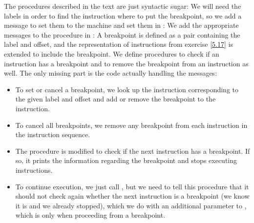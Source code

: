 \begin{exe}[5.19]
    The procedures described in the text are just syntactic sugar:
    We will need the labels in order to find the instruction where to put the 
    breakpoint, so we add a message to set them to the machine and set them in 
    :
    We add the appropriate messages to the  procedure in 
    :
    A breakpoint is defined as a pair containing the label and offset, and the 
    representation of instructions from exercise \ref{5.17} is extended to 
    include the breakpoint. We define procedures to check if an instruction has 
    a breakpoint and to remove the breakpoint from an instruction as well.
    The only missing part is the code actually handling the messages:
    \begin{itemize}
	\item To set or cancel a breakpoint, we look up the instruction 
	    corresponding to the given label and offset and add or remove the 
	    breakpoint to the instruction.
	\item To cancel all breakpoints, we remove any breakpoint from each 
	    instruction in the instruction sequence.
	\item The  procedure is modified to check if the next 
	    instruction has a breakpoint. If so, it prints the information 
	    regarding the breakpoint and stops executing instructions.
	\item To continue execution, we just call , but we need to 
	    tell this procedure that it should not check again whether the next 
	    instruction is a breakpoint (we know it is and we already stopped), 
	    which we do with an additional parameter to , which is 
	     only when proceeding from a breakpoint.
    \end{itemize}
\end{exe}
